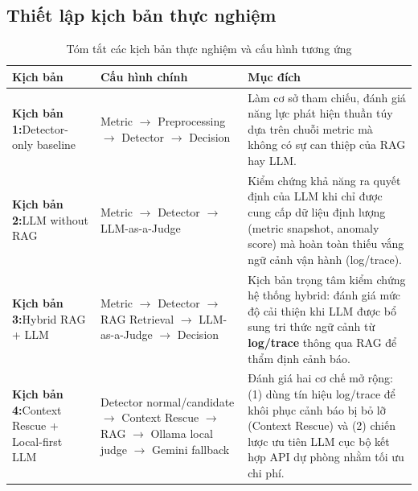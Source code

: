 \subsection{Thiết lập kịch bản thực nghiệm}
\begin{table}[H]
    \centering
    \renewcommand{\arraystretch}{1.6} %
    \begin{tabularx}{\textwidth}{
        >{\raggedright\arraybackslash}p{2.8cm} %
        >{\raggedright\arraybackslash}p{4.5cm} %
        >{\raggedright\arraybackslash}X        %
    }
        \toprule
        \rowcolor{blue!5}
        \textbf{Kịch bản} & \textbf{Cấu hình chính} & \textbf{Mục đích} \\
        \midrule
        
        \textbf{Kịch bản 1:}\newline Detector-only baseline & 
        Metric $\rightarrow$ Preprocessing $\rightarrow$ Detector $\rightarrow$ Decision & 
        Làm cơ sở tham chiếu, đánh giá năng lực phát hiện thuần túy dựa trên chuỗi metric mà không có sự can thiệp của RAG hay LLM. \\
        \hline
        
        \textbf{Kịch bản 2:}\newline LLM without RAG & 
        Metric $\rightarrow$ Detector $\rightarrow$ LLM-as-a-Judge & 
        Kiểm chứng khả năng ra quyết định của LLM khi chỉ được cung cấp dữ liệu định lượng (metric snapshot, anomaly score) mà hoàn toàn thiếu vắng ngữ cảnh vận hành (log/trace). \\
        \hline
        
        \textbf{Kịch bản 3:}\newline Hybrid RAG + LLM & 
        Metric $\rightarrow$ Detector $\rightarrow$ RAG Retrieval $\rightarrow$ LLM-as-a-Judge $\rightarrow$ Decision & 
        Kịch bản trọng tâm kiểm chứng hệ thống hybrid: đánh giá mức độ cải thiện khi LLM được bổ sung tri thức ngữ cảnh từ \textbf{log/trace} thông qua RAG để thẩm định cảnh báo. \\
        \hline
        
        \textbf{Kịch bản 4:}\newline Context Rescue + Local-first LLM & 
        Detector normal/candidate $\rightarrow$ Context Rescue $\rightarrow$ RAG $\rightarrow$ Ollama local judge $\rightarrow$ Gemini fallback & 
        Đánh giá hai cơ chế mở rộng: (1) dùng tín hiệu log/trace để khôi phục cảnh báo bị bỏ lỡ (Context Rescue) và (2) chiến lược ưu tiên LLM cục bộ kết hợp API dự phòng nhằm tối ưu chi phí. \\
        
        \bottomrule
    \end{tabularx}
    \caption{Tóm tắt các kịch bản thực nghiệm và cấu hình tương ứng}
    \label{tab:experiment_scenarios}
\end{table}
